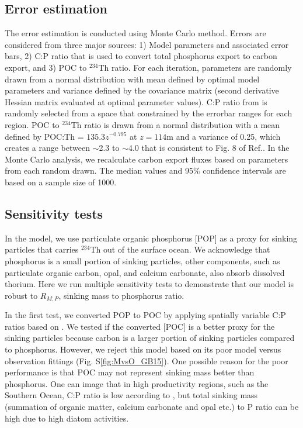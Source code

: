 \subsection{Error estimation}
The error estimation is conducted using Monte Carlo method. Errors are considered from three major sources:
1) Model parameters and associated error bars, 2) C:P ratio that is used to convert total phosphorus export to carbon export, and 3) POC to $^{234}$Th ratio.
For each iteration, parameters are randomly drawn from a normal distribution with mean defined by optimal model parameters and variance defined by the covariance matrix (second derivative Hessian matrix evaluated at optimal parameter values).
C:P ratio from \cite{Teng2014} is randomly selected from a space that constrained by the errorbar ranges for each region.
POC to $^{234}$Th ratio is drawn from a normal distribution with a mean defined by POC:Th = $135.3z^{-0.795}$ at $z = 114 $m and a variance of 0.25, which creates a range between $\sim$2.3 to $\sim$4.0 that is consistent to Fig. 8 of Ref.\citep{Owens2015}.
In the Monte Carlo analysis, we recalculate carbon export fluxes based on parameters from each random drawn.
The median values and 95\% confidence intervals are based{} on a sample size of 1000.

\subsection{Sensitivity tests}
In the model, we use particulate organic phosphorus [POP] as a proxy for sinking particles that carries $^{234}$Th out of the surface ocean.
We acknowledge that phosphorus is a small portion of sinking particles, other components, such as particulate organic carbon, opal, and calcium carbonate, also absorb dissolved thorium.
Here we run multiple sensitivity tests to demonstrate that our model is robust to $R_{M:P}$, sinking mass to phosphorus ratio.

In the first test, we converted POP to POC by applying spatially variable C:P ratios based on \cite{Galbraith2015}.
We tested if the converted [POC] is a better proxy for the sinking particles because carbon is a larger portion of sinking particles compared to phosphorus.
However, we reject this model based on its poor model versus observation fittings (Fig. S\ref{fig:MvsO_GB15}).
One possible reason for the poor performance is that POC may not represent sinking mass better than phosphorus.
One can image that in high productivity regions, such as the Southern Ocean, C:P ratio is low according to \cite{Galbraith2015}, but total sinking mass (summation of organic matter, calcium carbonate and opal etc.) to P ratio can be high due to high diatom activities.

